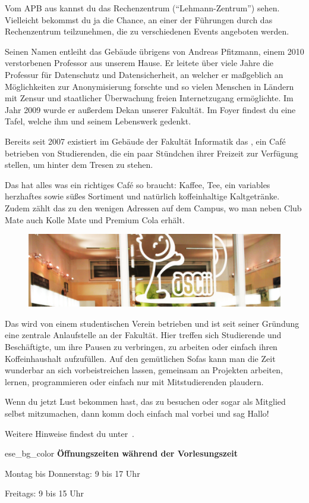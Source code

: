 Vom APB aus kannst du das Rechenzentrum (\enquote{Lehmann-Zentrum}) sehen. Vielleicht bekommst du ja die Chance, an einer der Führungen durch das Rechenzentrum teilzunehmen, die zu verschiedenen Events angeboten werden.

Seinen Namen entleiht das Gebäude übrigens von Andreas Pfitzmann, einem 2010 verstorbenen Professor aus unserem Hause.
Er leitete über viele Jahre die Professur für Datenschutz und Datensicherheit, an welcher er maßgeblich an Möglichkeiten zur Anonymisierung forschte und so vielen Menschen in Ländern mit Zensur und staatlicher Überwachung freien Internetzugang ermöglichte. Im Jahr 2009 wurde er außerdem Dekan unserer Fakultät.
Im Foyer findest du eine Tafel, welche ihm und seinem Lebenswerk gedenkt.

\pagebreak


Bereits seit 2007 existiert im Gebäude der Fakultät Informatik das \ascii{}, ein Café betrieben von Studierenden, die ein paar Stündchen ihrer Freizeit zur Verfügung stellen, um hinter dem Tresen zu stehen.

Das \ascii{} hat alles was ein richtiges Café so braucht: Kaffee, Tee, ein variables herzhaftes sowie süßes Sortiment und natürlich koffeinhaltige Kaltgetränke.
Zudem zählt das \ascii{} zu den wenigen Adressen auf dem Campus, wo man neben Club Mate auch Kolle Mate und Premium Cola erhält.

\begin{figure}[h!]
    \centering
    \includegraphics[width=\linewidth]{img/ascii.jpg}
\end{figure}

Das \ascii{} wird von einem studentischen Verein betrieben und ist seit seiner Gründung eine zentrale Anlaufstelle an der Fakultät.
Hier treffen sich Studierende und Beschäftigte, um ihre Pausen zu verbringen, zu arbeiten oder einfach ihren Koffeinhaushalt aufzufüllen.
Auf den gemütlichen Sofas kann man die Zeit wunderbar an sich vorbeistreichen lassen, gemeinsam an Projekten arbeiten, lernen, programmieren oder einfach nur mit Mitstudierenden plaudern.

Wenn du jetzt Lust bekommen hast, das \ascii{} zu besuchen oder sogar als Mitglied selbst mitzumachen, dann komm doch einfach mal vorbei und sag Hallo!

Weitere Hinweise findest du unter~.

\begin{awesomeblock}{2pt}{\faCalendar*[regular]}{ese_bg_color}
    \textbf{Öffnungszeiten während der Vorlesungszeit}

    Montag bis Donnerstag: 9 bis 17 Uhr

    Freitags: 9 bis 15 Uhr
\end{awesomeblock}
